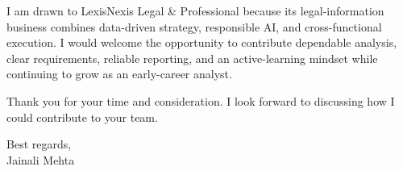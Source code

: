 \documentclass[letterpaper,11pt]{article}
\begin{document}
\bigbreak
I am drawn to LexisNexis Legal \& Professional because its legal-information business combines data-driven strategy, responsible AI, and cross-functional execution. I would welcome the opportunity to contribute dependable analysis, clear requirements, reliable reporting, and an active-learning mindset while continuing to grow as an early-career analyst.

\bigbreak
Thank you for your time and consideration. I look forward to discussing how I could contribute to your team.

\bigbreak
Best regards,\\
Jainali Mehta
\end{document}
